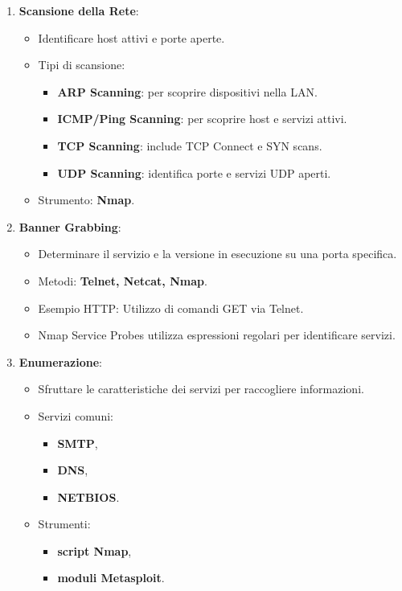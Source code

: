 \documentclass[12pt]{article}
\begin{document}
\begin{enumerate}
\begin{enumerate}
        \item \textbf{Scansione della Rete}:
        \begin{itemize}
            \item Identificare host attivi e porte aperte.
            \item Tipi di scansione:
            \begin{itemize}
                \item \textbf{ARP Scanning}: per scoprire dispositivi nella LAN.
                \item \textbf{ICMP/Ping Scanning}: per scoprire host e servizi attivi.
                \item \textbf{TCP Scanning}: include TCP Connect e SYN scans.
                \item \textbf{UDP Scanning}: identifica porte e servizi UDP aperti. 
            \end{itemize}
            \item Strumento: \textbf{Nmap}.
        \end{itemize}
        \item \textbf{Banner Grabbing}:
        \begin{itemize}
            \item Determinare il servizio e la versione in esecuzione su una 
            porta specifica.
            \item Metodi: \textbf{Telnet, Netcat, Nmap}.
            \item Esempio HTTP: Utilizzo di comandi GET via Telnet.
            \item Nmap Service Probes utilizza espressioni regolari per 
            identificare servizi.
        \end{itemize}
        \item \textbf{Enumerazione}:
        \begin{itemize}
            \item Sfruttare le caratteristiche dei servizi per raccogliere 
            informazioni.
            \item Servizi comuni: 
            \begin{itemize}
                \item \textbf{SMTP},
                \item \textbf{DNS},
                \item \textbf{NETBIOS}.
            \end{itemize}
            \item Strumenti: 
            \begin{itemize}
                \item \textbf{script Nmap},
                \item \textbf{moduli Metasploit}.
            \end{itemize}
        \end{itemize}
        

\end{enumerate}
\end{enumerate}
\end{document}
